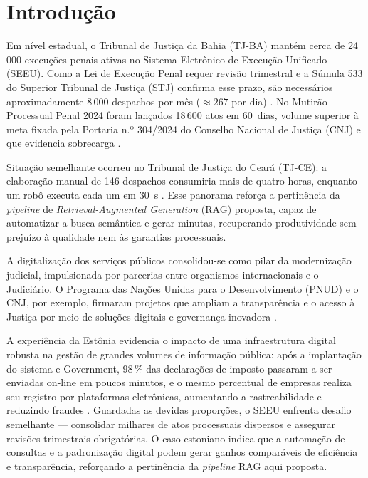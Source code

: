 
\chapter{Introdução}
\label{sec:introducao}

Em nível estadual, o Tribunal de Justiça da Bahia (TJ-BA) mantém cerca de 24\,000 execuções penais ativas no Sistema Eletrônico de Execução Unificado (SEEU). Como a Lei de Execução Penal requer revisão trimestral e a Súmula 533 do Superior Tribunal de Justiça (STJ) confirma esse prazo, são necessários aproximadamente 8\,000 despachos por mês (\(\approx 267\) por dia) \cite{brasil1984lep,stj2015sumula533}.  
No Mutirão Processual Penal 2024 foram lançados 18\,600 atos em 60~dias, volume superior à meta fixada pela Portaria n.º 304/2024 do Conselho Nacional de Justiça (CNJ) e que evidencia sobrecarga \cite{tjba2024mutirao,cnj2024portaria304}.

Situação semelhante ocorreu no Tribunal de Justiça do Ceará (TJ-CE): a elaboração manual de 146 despachos consumiria mais de quatro horas, enquanto um robô executa cada um em 30~s \cite{tjce2023robos}. Esse panorama reforça a pertinência da \textit{pipeline} de \textit{Retrieval-Augmented Generation} (RAG) proposta, capaz de automatizar a busca semântica e gerar minutas, recuperando produtividade sem prejuízo à qualidade nem às garantias processuais.

A digitalização dos serviços públicos consolidou-se como pilar da modernização judicial, impulsionada por parcerias entre organismos internacionais e o Judiciário. O Programa das Nações Unidas para o Desenvolvimento (PNUD) e o CNJ, por exemplo, firmaram projetos que ampliam a transparência e o acesso à Justiça por meio de soluções digitais e governança inovadora \cite{undp2025pnudcnj}.

A experiência da Estônia evidencia o impacto de uma infraestrutura digital robusta na gestão de grandes volumes de informação pública: após a implantação do sistema e-Government, 98\,\% das declarações de imposto passaram a ser enviadas on-line em poucos minutos, e o mesmo percentual de empresas realiza seu registro por plataformas eletrônicas, aumentando a rastreabilidade e reduzindo fraudes \cite{divald2021eformalization}.  
Guardadas as devidas proporções, o SEEU enfrenta desafio semelhante — consolidar milhares de atos processuais dispersos e assegurar revisões trimestrais obrigatórias. O caso estoniano indica que a automação de consultas e a padronização digital podem gerar ganhos comparáveis de eficiência e transparência, reforçando a pertinência da \textit{pipeline} RAG aqui proposta.

